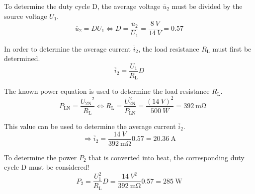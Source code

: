 \begin {solutionblock}

To determine the duty cycle D, the average voltage $\overline u_2$  must be divided by the source voltage $U_1$.
\begin{equation}
    \overline u_2 = D U_1 \Leftrightarrow D = \frac{\overline u_2}{U_1} = \frac{8\ \si{V}}{14 \ \si{V}}=0.57
\end{equation}
    
In order to determine the average current $\overline i_2$, the load resistance $R_{\mathrm{L}}$ must first be determined.
\begin{equation}
   \overline i_2 = \frac{U_1}{ R_{\mathrm{L}}}  D
\end{equation}

The known power equation is used to determine the load resistance $R_{\mathrm{L}}$.
\begin{equation}
   \quad  P_{\mathrm{LN}} = \frac{{ U_{\mathrm{2N}}}^2}{ R_{\mathrm{L}}} 
 \Leftrightarrow  R_{\mathrm{L}} = \frac{ U_{\mathrm{2N}}^2}{ P_{\mathrm{LN}}} = \frac{(14\ \si{V})^2}{500\ \si{W}} = \SI{392}{\mohm}
\end{equation}

This value can be used to determine the average current $\overline i_2$.
 $$\Rightarrow \overline i_2 = \frac{14\ \si{V}}{392\ \si{\mohm}} 0.57 =  \SI{20.36}{\ampere}$$
 
 To determine the power $P_2$ that is converted into heat, the corresponding duty cycle D must be considered!
 \begin{equation}
 P_2 = \frac{U_1^2}{ R_{\mathrm{L}}}  D = \frac{14\ \si{V}^2}{392\ \si{\mohm}}  0.57 = \SI{285}{\watt}
\end{equation}
\end{solutionblock}
	



